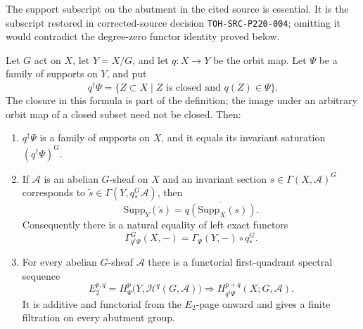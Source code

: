 \begin{lemma}
\label{lemma-orbit-space-equivariant-support-spectral-sequence}
\begin{reference}
\cite[Chapter V, \S 5.7, pp. 219--220]{Tohoku}
\end{reference}
\begin{history}
The support subscript on the abutment in the cited source is essential. It
is the subscript restored in corrected-source decision
\texttt{TOH-SRC-P220-004}; omitting it would contradict the degree-zero
functor identity proved below.
\end{history}
Let $G$ act on $X$, let $Y=X/G$, and let $q:X\to Y$ be the orbit map. Let
$\Psi$ be a family of supports on $Y$, and put
$$
q^\dagger\Psi=
\{Z\subset X\mid Z\text{ is closed and }
\overline{q(Z)}\in\Psi\}.
$$
The closure in this formula is part of the definition; the image under an
arbitrary orbit map of a closed subset need not be closed. Then:
\begin{enumerate}
\item $q^\dagger\Psi$ is a family of supports on $X$, and it equals its
invariant saturation $(q^\dagger\Psi)^G$.
\item If $\mathcal A$ is an abelian $G$-sheaf on $X$ and an invariant
section $s\in\Gamma(X,\mathcal A)^G$ corresponds to
$\widetilde s\in\Gamma(Y,q_*^G\mathcal A)$, then
$$
\text{Supp}_Y(\widetilde s)
=
\overline{q(\text{Supp}_X(s))}.
$$
Consequently there is a natural equality of left exact functors
$$
\Gamma^G_{q^\dagger\Psi}(X,-)
=
\Gamma_\Psi(Y,-)\circ q_*^G.
$$
\item For every abelian $G$-sheaf $\mathcal A$ there is a functorial
first-quadrant spectral sequence
$$
E_2^{p,q}
=
H^p_\Psi\bigl(Y,\mathcal H^q(G,\mathcal A)\bigr)
\Longrightarrow
H^{p+q}_{q^\dagger\Psi}(X;G,\mathcal A).
$$
It is additive and functorial from the $E_2$-page onward and gives a
finite filtration on every abutment group.
\end{enumerate}
\end{lemma}


